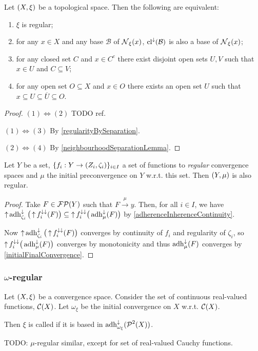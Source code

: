\begin{proposition} \label{topologicalRegularity}
Let $\sSet{X,\xi}$ be a topological space. Then the following are equivalent:
\begin{enumerate}
\item $\xi$ is regular;
\item for any $x\in X$ and any base $\mathcal{B}$ of $\operatorname{\mathcal{N}}_\xi(x)$, $\operatorname{cl}^\downarrow(\mathcal{B})$ is also a base of $\operatorname{\mathcal{N}}_\xi(x)$;
\item for any closed set $C$ and $x\in C^c$ there exist disjoint open sets $U,V$ such that $x\in U$ and $C\subseteq V$;
\item for any open set $O\subseteq X$ and $x\in O$ there exists an open set $U$ such that $x\subseteq U\subseteq \overline{U} \subseteq O$.
\end{enumerate}
\end{proposition}
\begin{proof}
$(1) \Leftrightarrow (2)$ TODO ref.

$(1) \Leftrightarrow (3)$ By \ref{regularityBySeparation}.

$(2) \Leftrightarrow (4)$ By \ref{neighbourhoodSeparationLemma}.
\end{proof}

\begin{proposition} \label{regularityInitialConvergence}
Let $Y$ be a set, $\{f_i: Y\to \sSet{Z_i, \zeta_i}\}_{i\in I}$ a set of functions to \emph{regular} convergence spaces and $\mu$ the initial preconvergence on $Y$ w.r.t. this set. Then $\sSet{Y,\mu}$ is also regular.
\end{proposition}
\begin{proof}
Take $F\in \operatorname{\mathcal{FP}}(Y)$ such that $F\overset{\mu}{\longrightarrow} y$. Then, for all $i\in I$, we have $\operatorname{\uparrow}\operatorname{adh}_{\zeta_i}^\downarrow\big(\operatorname{\uparrow} f_i^{\downarrow\downarrow}(F)\big)\subseteq \operatorname{\uparrow} f_i^{\downarrow\downarrow}\big(\operatorname{adh}_{\mu}^{\downarrow}(F)\big)$ by \ref{adherenceInherenceContinuity}.

Now $\operatorname{\uparrow}\operatorname{adh}_{\zeta_i}^\downarrow\big(\operatorname{\uparrow} f_i^{\downarrow\downarrow}(F)\big)$ converges by continuity of $f_i$ and regularity of $\zeta_i$, so $\operatorname{\uparrow} f_i^{\downarrow\downarrow}\big(\operatorname{adh}_{\mu}^{\downarrow}(F)\big)$ converges by monotonicity and thus $\operatorname{adh}_{\mu}^{\downarrow}(F)$ converges by \ref{initialFinalConvergence}.
\end{proof}

\subsubsection{$\omega$-regular}
\begin{definition}
Let $\sSet{X,\xi}$ be a convergence space. Consider the set of continuous real-valued functions, $\operatorname{\mathcal{C}}(X)$. Let $\omega_\xi$ be the initial convergence on $X$ w.r.t. $\operatorname{\mathcal{C}}(X)$.

Then $\xi$ is called  if it is based in $\operatorname{adh}_{\omega_\xi}^{\downarrow}(\operatorname{\mathcal{P}}^2(X))$.
\end{definition}
TODO: $\mu$-regular similar, except for set of real-valued Cauchy functions.

